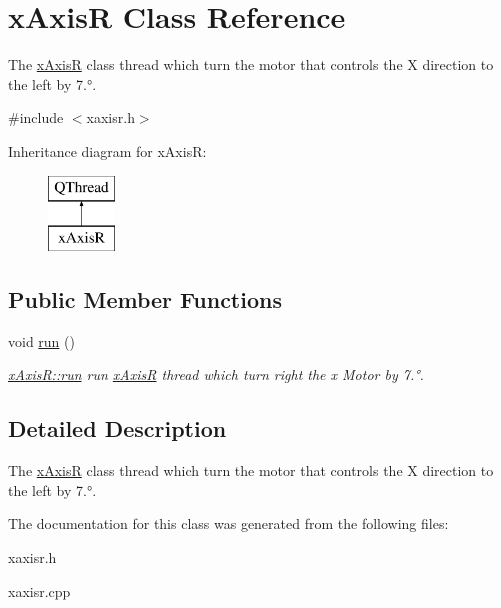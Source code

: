\hypertarget{classx_axis_r}{}\section{x\+AxisR Class Reference}
\label{classx_axis_r}


The \mbox{\hyperlink{classx_axis_r}{x\+AxisR}} class thread which turn the motor that controls the X direction to the left by 7.°.  




{\ttfamily \#include $<$xaxisr.\+h$>$}

Inheritance diagram for x\+AxisR\+:\begin{figure}[H]
\begin{center}
\leavevmode
\includegraphics[height=2.000000cm]{classx_axis_r}
\end{center}
\end{figure}
\subsection*{Public Member Functions}
\begin{DoxyCompactItemize}
\item 
\mbox{\label{classx_axis_r_ab2035ef8ac72985b834ca2d5623ecda7}} 
void \mbox{\hyperlink{classx_axis_r_ab2035ef8ac72985b834ca2d5623ecda7}{run}} ()
\begin{DoxyCompactList}\small\item\em \mbox{\hyperlink{classx_axis_r_ab2035ef8ac72985b834ca2d5623ecda7}{x\+Axis\+R\+::run}} run \mbox{\hyperlink{classx_axis_r}{x\+AxisR}} thread which turn right the x Motor by 7.°. \end{DoxyCompactList}\end{DoxyCompactItemize}


\subsection{Detailed Description}
The \mbox{\hyperlink{classx_axis_r}{x\+AxisR}} class thread which turn the motor that controls the X direction to the left by 7.°. 

The documentation for this class was generated from the following files\+:\begin{DoxyCompactItemize}
\item 
xaxisr.\+h\item 
xaxisr.\+cpp\end{DoxyCompactItemize}

